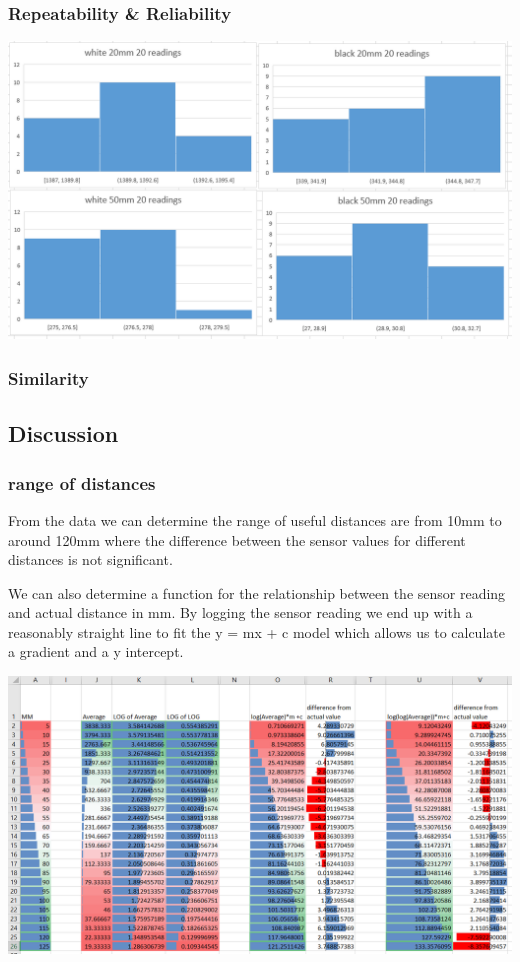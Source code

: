 \documentclass[11pt,a4paper,titlepage]{article}
\begin{document}
	\subsubsection{Repeatability \& Reliability}
		\includegraphics[width=\textwidth,height=\textheight,keepaspectratio]{irReliablityGraph}
	\subsubsection{Similarity}
\subsection{Discussion}
	\subsubsection{range of distances}
		From the data we can determine the range of useful distances are from 10mm to around 120mm where the difference between the sensor values for different distances is not significant.
		
		We can also determine a function for the relationship between the sensor reading and actual distance in mm. By logging the sensor reading we end up with a reasonably straight line to fit the y = mx + c model which allows us to calculate a gradient and a y intercept.
		
		\includegraphics[width=\textwidth,height=\textheight,keepaspectratio]{irRangeLineData}
		
\end{document}
